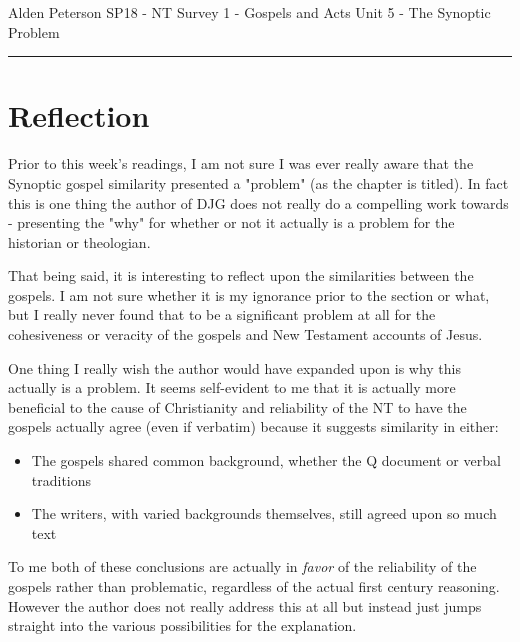 \documentclass[12pt]{turabian-researchpaper}
\begin{document}
\begin{singlespace}
\noindent Alden Peterson \newline
\noindent SP18 - NT Survey 1 - Gospels and Acts\newline
\noindent Unit 5 - The Synoptic Problem\newline
\noindent\rule{4cm}{0.4pt}
\end{singlespace}





\section{Reflection}

Prior to this week's readings, I am not sure I was ever really aware that the Synoptic gospel similarity presented a "problem" (as the chapter is titled). In fact this is one thing the author of DJG does not really do a compelling work towards - presenting the "why" for whether or not it actually is a problem for the historian or theologian.

That being said, it is interesting to reflect upon the similarities between the gospels. I am not sure whether it is my ignorance prior to the section or what, but I really never found that to be a significant problem at all for the cohesiveness or veracity of the gospels and New Testament accounts of Jesus.

One thing I really wish the author would have expanded upon is why this actually is a problem. It seems self-evident to me that it is actually more beneficial to the cause of Christianity and reliability of the NT to have the gospels actually agree (even if verbatim) because it suggests similarity in either:

\begin{itemize}
\item The gospels shared common background, whether the Q document or verbal traditions
\item The writers, with varied backgrounds themselves, still agreed upon so much text

\end{itemize}

To me both of these conclusions are actually in \textit{favor} of the reliability of the gospels rather than problematic, regardless of the actual first century reasoning. However the author does not really address this at all but instead just jumps straight into the various possibilities for the explanation.
\end{document}
